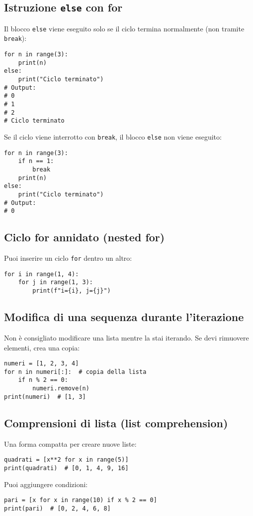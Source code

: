 \documentclass[a4paper,12pt]{article}
\begin{document}
\subsection*{Istruzione \texttt{else} con for}
Il blocco \texttt{else} viene eseguito solo se il ciclo termina normalmente (non tramite \texttt{break}):
\begin{lstlisting}
for n in range(3):
    print(n)
else:
    print("Ciclo terminato")
# Output:
# 0
# 1
# 2
# Ciclo terminato
\end{lstlisting}

Se il ciclo viene interrotto con \texttt{break}, il blocco \texttt{else} non viene eseguito:
\begin{lstlisting}
for n in range(3):
    if n == 1:
        break
    print(n)
else:
    print("Ciclo terminato")
# Output:
# 0
\end{lstlisting}

\subsection*{Ciclo for annidato (nested for)}
Puoi inserire un ciclo \texttt{for} dentro un altro:
\begin{lstlisting}
for i in range(1, 4):
    for j in range(1, 3):
        print(f"i={i}, j={j}")
\end{lstlisting}

\subsection*{Modifica di una sequenza durante l'iterazione}
Non è consigliato modificare una lista mentre la stai iterando. Se devi rimuovere elementi, crea una copia:
\begin{lstlisting}
numeri = [1, 2, 3, 4]
for n in numeri[:]:  # copia della lista
    if n % 2 == 0:
        numeri.remove(n)
print(numeri)  # [1, 3]
\end{lstlisting}

\subsection*{Comprensioni di lista (list comprehension)}
Una forma compatta per creare nuove liste:
\begin{lstlisting}
quadrati = [x**2 for x in range(5)]
print(quadrati)  # [0, 1, 4, 9, 16]
\end{lstlisting}
Puoi aggiungere condizioni:
\begin{lstlisting}
pari = [x for x in range(10) if x % 2 == 0]
print(pari)  # [0, 2, 4, 6, 8]
\end{lstlisting}
\end{document}
